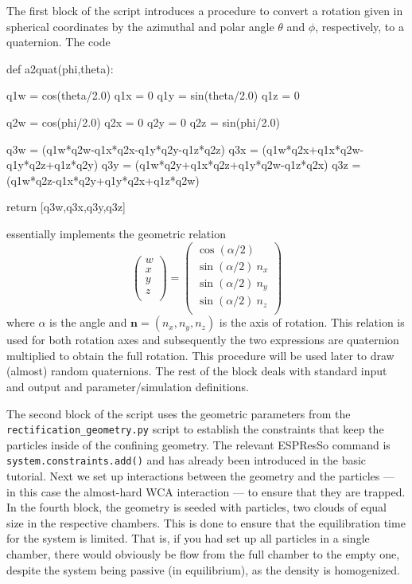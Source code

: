 \documentclass[aip,jcp,reprint,a4paper,onecolumn,amsmath]{revtex4-1}
\newcommand\code{\lstinline}
\newcommand{\es}{\mbox{\textsf{ESPResSo}}\xspace}
\newcommand\codees{\lstinline[language=python]}
\begin{document}
The first block of the script introduces a procedure to convert a rotation
given in spherical coordinates by the azimuthal and polar angle $\theta$ and
$\phi$, respectively, to a quaternion. The code
\begin{espresso}
def a2quat(phi,theta):

    q1w = cos(theta/2.0)
    q1x = 0
    q1y = sin(theta/2.0)
    q1z = 0

    q2w = cos(phi/2.0)
    q2x = 0
    q2y = 0
    q2z = sin(phi/2.0)

    q3w = (q1w*q2w-q1x*q2x-q1y*q2y-q1z*q2z)
    q3x = (q1w*q2x+q1x*q2w-q1y*q2z+q1z*q2y)
    q3y = (q1w*q2y+q1x*q2z+q1y*q2w-q1z*q2x)
    q3z = (q1w*q2z-q1x*q2y+q1y*q2x+q1z*q2w)

    return [q3w,q3x,q3y,q3z]
\end{espresso}
essentially implements the geometric relation
\begin{equation}
  \begin{pmatrix}
    w \\ x \\ y \\ z \\
  \end{pmatrix}
  =
  \begin{pmatrix}
    \cos(\alpha/2) \\
    \sin(\alpha/2)\ n_x \\
    \sin(\alpha/2)\ n_y \\
    \sin(\alpha/2)\ n_z \\
  \end{pmatrix}
\end{equation}
where $\alpha$ is the angle and $\mathbf{n} = (n_x,n_y,n_z)$ is the
axis of rotation. This relation is used for both rotation axes and subsequently
the two expressions are quaternion multiplied to obtain the full rotation. This
procedure will be used later to draw (almost) random quaternions. The rest of
the block deals with standard input and output and parameter/simulation
definitions.

The second block of the script uses the geometric parameters from the
\code{rectification_geometry.py} script to establish the constraints that keep
the particles inside of the confining geometry. The relevant \es{} command is
\codees{system.constraints.add()} and has already been introduced in the basic
tutorial. Next we set up interactions between the geometry and the particles
--- in this case the almost-hard WCA interaction --- to ensure that they are
trapped. In the fourth block, the geometry is seeded with particles, two clouds
of equal size in the respective chambers. This is done to ensure that the
equilibration time for the system is limited. That is, if you had set up all
particles in a single chamber, there would obviously be flow from the full
chamber to the empty one, despite the system being passive (in equilibrium), as
the density is homogenized.
\end{document}
